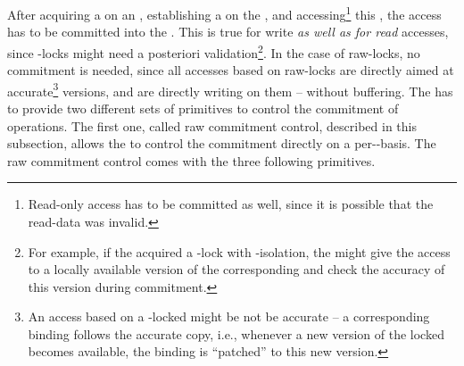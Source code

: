 \documentclass[a4paper, 12pt]{book}
\begin{document}
\newcommand{\dbaiVALIDATE}{{\normalfont\textsc{validate}}\xspace}
\newcommand{\dbaiCOMMIT}{{\normalfont\textsc{commit}}\xspace}
\newcommand{\dbaiRELEASE}{{\normalfont\textsc{release}}\xspace}

After acquiring a  on an , establishing a  on
the , and accessing\footnote{Read-only access has to be
  committed as well, since it is possible that the read-data was invalid.}
this , the access has to be committed into the \SYNEIGHT.
%
This is true for write \emph{as well as for read} accesses, since
\TRANSREAD-locks might need a posteriori validation\footnote{For
example, if the  acquired a \TRANSREAD-lock with
\isoACCURATE-isolation, the \SYNEIGHT might give the 
access to a locally available version of the corresponding 
and check the accuracy of this version during commitment.}. In the case of raw-locks,
no commitment is needed, since all accesses based on raw-locks are
directly aimed at accurate\footnote{An access based on a  \CONCREAD-locked 
might be not be accurate -- a corresponding binding follows the
accurate copy, i.e., whenever a new version of the locked 
becomes available, the binding is ``patched'' to this new version.}
versions, and are directly writing on them -- without buffering. 
%
The \SYNEIGHT has to provide two different sets of primitives to control
the commitment of operations. The first one, called raw commitment control,
described in this subsection, allows the  to control the commitment
directly on a per--basis. 
%
The raw commitment control comes with the three following primitives. 
\end{document}
